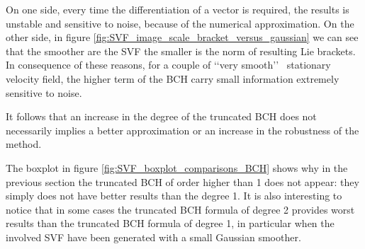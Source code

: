 On one side, every time the differentiation of a vector is required, the results is unstable and sensitive to noise, because of the numerical approximation. On the other side, in figure \ref{fig:SVF_image_scale_bracket_versus_gaussian} we can see that the smoother are the SVF the smaller is the norm of resulting Lie brackets. In consequence of these reasons, for a couple of \lq\lq very smooth\rq\rq~ stationary velocity field, the higher term of the BCH carry small information extremely sensitive to noise.

It follows that an increase in the degree of the truncated BCH does not necessarily implies a better approximation or an increase in the robustness of the method. 

The boxplot in figure \ref{fig:SVF_boxplot_comparisons_BCH} shows why in the previous section the truncated BCH of order higher than 1 does not appear: they simply does not have better results than the degree 1. It is also interesting to notice that in some cases the truncated BCH formula of degree 2 provides worst results than the truncated BCH formula of degree 1, in particular when the involved SVF have been generated with a small Gaussian smoother.

